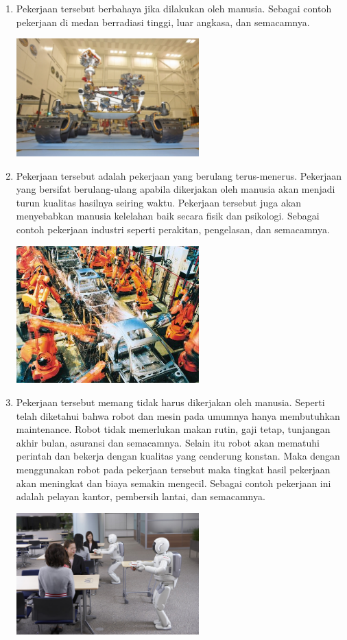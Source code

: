 \documentclass{article}
\begin{document}
\begin{enumerate}

 \item Pekerjaan tersebut berbahaya jika dilakukan oleh manusia. 
 Sebagai contoh pekerjaan di medan berradiasi tinggi, luar angkasa, dan semacamnya.
 \begin{center}
 \includegraphics[width=200pt]{mars}
\end{center}

\item Pekerjaan tersebut adalah pekerjaan yang berulang terus-menerus.
Pekerjaan yang bersifat berulang-ulang apabila dikerjakan oleh manusia akan menjadi turun kualitas hasilnya seiring waktu.
Pekerjaan tersebut juga akan menyebabkan manusia kelelahan baik secara fisik dan psikologi.
Sebagai contoh pekerjaan industri seperti perakitan, pengelasan, dan semacamnya.
 \begin{center}
 \includegraphics[width=200pt]{industrial_robots}
\end{center}

\item Pekerjaan tersebut memang tidak harus dikerjakan oleh manusia.
Seperti telah diketahui bahwa robot dan mesin pada umumnya hanya membutuhkan maintenance.
Robot tidak memerlukan makan rutin, gaji tetap, tunjangan akhir bulan, asuransi dan semacamnya.
Selain itu robot akan mematuhi perintah dan bekerja dengan kualitas yang cenderung konstan.
Maka dengan menggunakan robot pada pekerjaan tersebut maka tingkat hasil pekerjaan akan meningkat dan biaya semakin mengecil.
Sebagai contoh pekerjaan ini adalah pelayan kantor, pembersih lantai, dan semacamnya.
\begin{center}
 \includegraphics[width=200pt]{help_human}
\end{center}


\end{enumerate}
\end{document}
